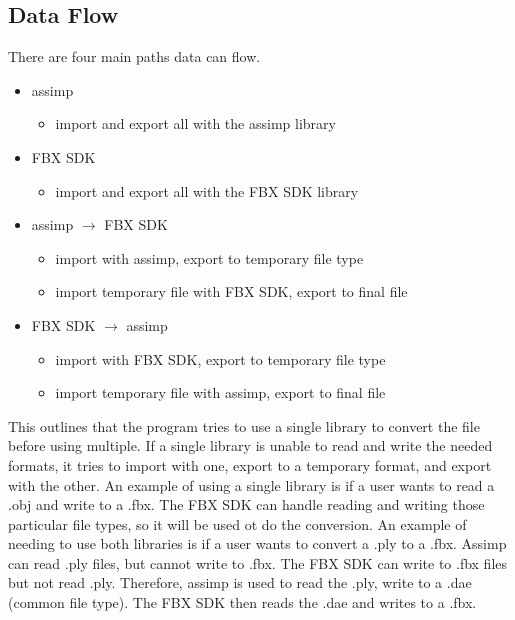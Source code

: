     \subsection{Data Flow}
        There are four main paths data can flow.
        \begin{itemize}
            \item assimp
            \begin{itemize}
                \item import and export all with the assimp library
            \end{itemize}
            
            \item FBX SDK
            \begin{itemize}
                \item import and export all with the FBX SDK library
            \end{itemize}

            \item assimp $\rightarrow$ FBX SDK
            \begin{itemize}
                \item import with assimp, export to temporary file type
                \item import temporary file with FBX SDK, export to final file 
            \end{itemize}

            \item FBX SDK $\rightarrow$ assimp
            \begin{itemize}
                \item import with FBX SDK, export to temporary file type
                \item import temporary file with assimp, export to final file 
            \end{itemize}
        \end{itemize}
        
        This outlines that the program tries to use a single library to convert the file before using multiple.  If a single library is unable to 
        read and write the needed formats, it tries to import with one, export to a temporary format, and export with the other.  An example of 
        using a single library is if a user wants to read a .obj and write to a .fbx.  The FBX SDK can handle reading and writing those particular file
        types, so it will be used ot do the conversion.  An example of needing to use both libraries is if a user wants to convert a .ply to a .fbx.
        Assimp can read .ply files, but cannot write to .fbx.  The FBX SDK can write to .fbx files but not read .ply.  Therefore, assimp is used to 
        read the .ply, write to a .dae (common file type).  The FBX SDK then reads the .dae and writes to a .fbx.

